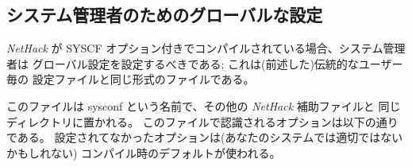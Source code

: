 \subsection*{システム管理者のためのグローバルな設定}

{\it NetHack\/} が SYSCF オプション付きでコンパイルされている場合、システム管理者は
グローバル設定を設定するべきである; これは(前述した)伝統的なユーザー毎の
設定ファイルと同じ形式のファイルである。

このファイルは sysconf という名前で、その他の {\it NetHack\/} 補助ファイルと
同じディレクトリに置かれる。
このファイルで認識されるオプションは以下の通りである。
設定されてなかったオプションは(あなたのシステムでは適切ではないかもしれない)
コンパイル時のデフォルトが使われる。

